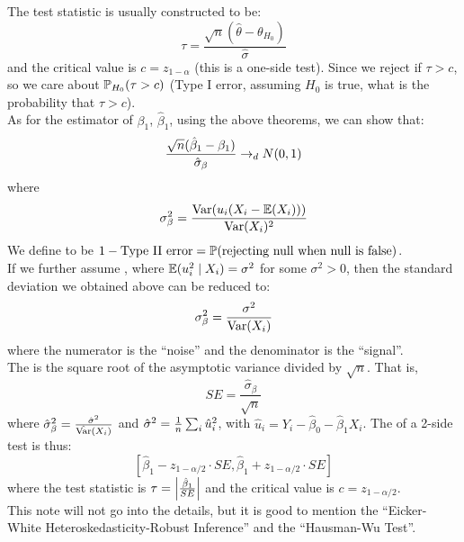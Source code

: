The test statistic is usually constructed to be:
$$\tau = \frac{\sqrt{n}(\hat{\theta} - \theta_{H_0})}{\hat{\sigma}}$$
and the critical value is $c = z_{1 - \alpha}$ (this is a one-side test). Since we reject if $\tau > c$, so we care about $\mathbb{P}_{H_0}(\tau > c)$ (Type I error, assuming $H_0$ is true, what is the probability that $\tau > c$). \\
As for the estimator of $\beta_1$, $\hat{\beta}_1$, using the above theorems, we can show that:
$$\frac{\sqrt{n}(\hat{\beta}_1 - \beta_1)}{\hat{\sigma}_\beta} \to_d N(0, 1)$$
where
$$\sigma_\beta^2 = \frac{\text{Var}(u_i(X_i - \mathbb{E}(X_i)))}{\text{Var}(X_i)^2}$$
We define  to be $1 - \text{Type II error} = \mathbb{P}(\text{rejecting null when null is false})$. \\
If we further assume , where $\mathbb{E}(u_i^2 \mid X_i) = \sigma^2$ for some $\sigma^2 > 0$, then the standard deviation we obtained above can be reduced to:
$$\sigma_\beta^2 = \frac{\sigma^2}{\text{Var}(X_i)}$$
where the numerator is the ``noise'' and the denominator is the ``signal''. \\
The  is the square root of the asymptotic variance divided by $\sqrt{n}$. That is,
$$SE = \frac{\hat{\sigma}_\beta}{\sqrt{n}}$$
where $\hat{\sigma}_\beta^2 = \frac{\hat{\sigma}^2}{\hat{\text{Var}}(X_i)}$ and $\hat{\sigma}^2 = \frac{1}{n}\sum_{i} \hat{u}_i^2$, with $\hat{u}_i = Y_i - \hat{\beta}_0 - \hat{\beta}_1 X_i$.
The  of a 2-side test is thus:
$$[\hat{\beta}_1 - z_{1 - \alpha/2} \cdot SE, \hat{\beta}_1 + z_{1 - \alpha/2} \cdot SE]$$
where the test statistic is $\tau = \abs{\frac{\hat{\beta}_1}{SE}}$ and the critical value is $c = z_{1 - \alpha/2}$. \\
This note will not go into the details, but it is good to mention the ``Eicker-White Heteroskedasticity-Robust Inference'' and the ``Hausman-Wu Test''.

